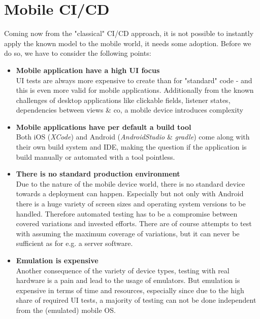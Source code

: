 \section{Mobile CI/CD}

Coming now from the "classical" CI/CD approach, it is not possible to instantly apply the known model to the mobile world, it needs some adoption. Before we do so, we have to consider the following points: \\

\begin{itemize}
	
	\item \textbf{Mobile application have a high UI focus} \\
	UI tests are always more expensive to create than for "standard" code - and this is even more valid for mobile applications. Additionally from the known challenges of desktop applications like clickable fields, listener states, dependencies between views \& co, a mobile device introduces complexity
	\\
	
	\item \textbf{Mobile applications have per default a build tool} \\
	Both iOS (\textit{XCode}) and Android (\textit{AndroidStudio} \& \textit{gradle}) come along with their own build system and IDE, making the question if the application is build manually or automated with a tool pointless.
	\\
	
	\item \textbf{There is no standard production environment} \\
	Due to the nature of the mobile device world, there is no standard device towards a deployment can happen. Especially but not only with Android there is a huge variety of screen sizes and operating system versions to be handled. Therefore automated testing has to be a compromise between covered variations and invested efforts. There are of course attempts to test with assuming the maximum coverage of variations, but it can never be sufficient as for e.g. a server software.
	\\
	
	\item \textbf{Emulation is expensive} \\
	Another consequence of the variety of device types, testing with real hardware is a pain and lead to the usage of emulators. But emulation is expensive in terms of time and resources, especially since due to the high share of required UI tests, a majority of testing can not be done independent from the (emulated) mobile OS.
	
\end{itemize}

